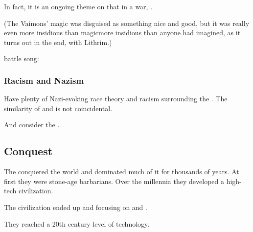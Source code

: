 In fact, it is an ongoing theme on \Miith that in a war, . 

(The Vaimons' magic was disguised as something nice and good, but it was really even more insidious than \xs magic\dash{}more insidious than anyone had imagined, as it turns out in the end, with Lithrim.)

\Aryoth battle song:





\subsubsection{Racism and Nazism}
Have plenty of Nazi-evoking race theory and racism surrounding the \aryothim. 
The similarity of \quo{\aryoth} and  is not coincidental. 

And consider the . 










\subsection{Conquest}
The \aryothim conquered the world and dominated much of it for thousands of years.
At first they were stone-age barbarians.
Over the millennia they developed a high-tech civilization.

The \aryoth civilization ended up  and focusing on  and . 

They reached a 20th century level of technology.





